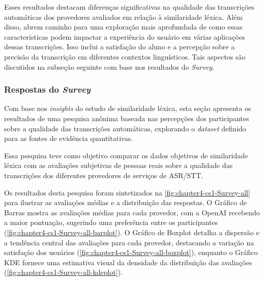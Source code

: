 Esses resultados destacam diferenças significativas na qualidade das transcrições automáticas dos provedores avaliados em relação à similaridade léxica. Além disso, abrem caminho para uma exploração mais aprofundada de como essas características podem impactar a experiência do usuário em várias aplicações dessas transcrições. Isso inclui a satisfação do aluno e a percepção sobre a precisão da transcrição em diferentes contextos linguísticos. Tais aspectos são discutidos na subseção seguinte com base nos resultados do \textit{Survey}.

\subsubsection{Respostas do \textit{Survey}}

Com base nos \textit{insights} do estudo de similaridade léxica, esta seção apresenta os resultados de uma pesquisa anônima baseada nas percepções dos participantes sobre a qualidade das transcrições automáticas, explorando o \textit{dataset} definido para as fontes de evidência quantitativas. 

Essa pesquisa teve como objetivo comparar os dados objetivos de similaridade léxica com as avaliações subjetivas de pessoas reais sobre a qualidade das transcrições dos diferentes provedores de serviços de ASR/STT.

Os resultados desta pesquisa foram sintetizados na \autoref{fig:chapter4-cs1-Survey-all} para ilustrar as avaliações médias e a distribuição das respostas. O Gráfico de Barras mostra as avaliações médias para cada provedor, com a OpenAI recebendo a maior pontuação, sugerindo uma preferência entre os participantes (\ref{fig:chapter4-cs1-Survey-all-barplot}). O Gráfico de Boxplot detalha a dispersão e a tendência central das avaliações para cada provedor, destacando a variação na satisfação dos usuários (\ref{fig:chapter4-cs1-Survey-all-boxplot}), enquanto o Gráfico KDE fornece uma estimativa visual da densidade da distribuição das avaliações (\ref{fig:chapter4-cs1-Survey-all-kdeplot}).

